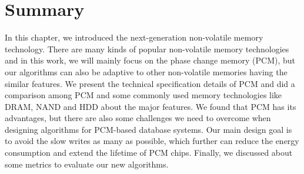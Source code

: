 \section{Summary}
In this chapter, we introduced the next-generation non-volatile memory technology. There are many kinds of popular non-volatile memory technologies and in this work, we will mainly focus on the phase change memory (PCM), but our algorithms can also be adaptive to other non-volatile memories having the similar features. We present the technical specification details of PCM and did a comparison among PCM and some commonly used memory technologies like DRAM, NAND and HDD about the major features. We found that PCM has its advantages, but there are also some challenges we need to overcome when designing algorithms for PCM-based database systems. Our main design goal is to avoid the slow writes as many as possible, which further can reduce the energy consumption and extend the lifetime of PCM chips. Finally, we discussed about some metrics to evaluate our new algorithms.

\newpage
%
